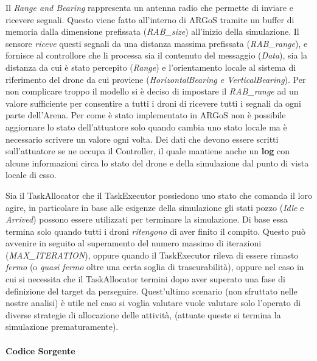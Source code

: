 \documentclass[a4paper,11pt,oneside, table]{article}
\begin{document}
Il \textit{Range and Bearing} rappresenta un antenna radio che permette di inviare e ricevere segnali. Questo viene fatto all'interno di ARGoS tramite un buffer di memoria dalla dimensione prefissata (\textit{RAB\_size}) all'inizio della simulazione.
Il sensore \textit{riceve} questi segnali da una distanza massima prefissata (\textit{RAB\_range}), e fornisce al controllore che li processa sia il contenuto del messaggio (\textit{Data}), sia la distanza da cui \`e stato percepito (\textit{Range}) e l'orientamento locale al sistema di riferimento del drone da cui proviene (\textit{HorizontalBearing e VerticalBearing}).
Per non complicare troppo il modello si \`e deciso di impostare il \textit{RAB\_range} ad un valore sufficiente per consentire a tutti i droni di ricevere tutti i segnali da ogni parte dell'Arena.
Per come \`e stato implementato in ARGoS non \`e possibile aggiornare lo stato dell'attuatore solo quando cambia uno stato locale ma \`e necessario scrivere un valore ogni volta. %
Dei dati che devono essere scritti sull'attuatore se ne occupa il Controller, il quale mantiene anche un \textbf{log} con alcune informazioni circa lo stato del drone e della simulazione dal punto di vista locale di esso.

Sia il TaskAllocator che il TaskExecutor possiedono uno stato che comanda il loro agire, in particolare in base alle esigenze della simulazione gli stati pozzo (\textit{Idle} e \textit{Arrived}) possono essere utilizzati per terminare la simulazione.
Di base essa termina solo quando tutti i droni \textit{ritengono} di aver finito il compito. Questo pu\`o avvenire in seguito al superamento del numero massimo di iterazioni (\textit{MAX\_ITERATION}), oppure quando il TaskExecutor rileva di essere rimasto \textit{fermo} (o \textit{quasi fermo} oltre una certa soglia di trascurabilit\`a), oppure nel caso in cui si necessita che il TaskAllocator termini dopo aver superato una fase di definizione del target da perseguire.
Quest'ultimo scenario (non sfruttato nelle nostre analisi) \`e utile nel caso si voglia valutare vuole valutare solo l'operato di diverse strategie di allocazione delle attivit\`a, (attuate queste si termina la simulazione prematuramente).


\paragraph{Codice Sorgente}
\end{document}
